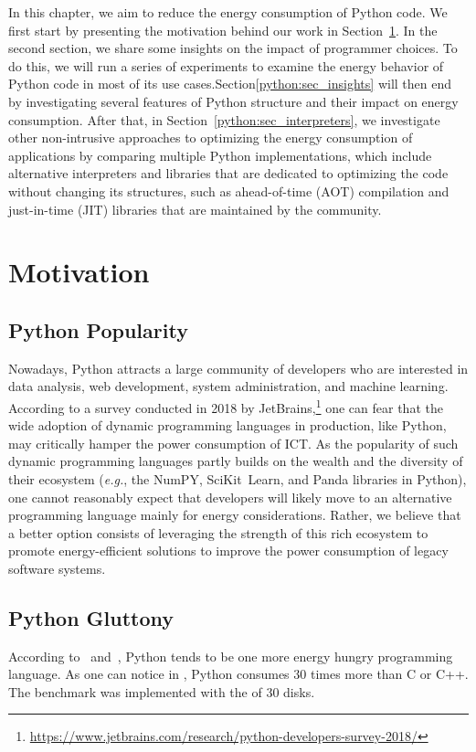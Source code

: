In this chapter, we aim to reduce the energy consumption of Python code.
We first start by presenting the motivation behind our work in Section~\ref{python:sec_motivation}.
In the second section, we share some insights on the impact of programmer choices. To do this, we will run a series of experiments to examine the energy behavior of Python code in most of its use cases.Section\ref{python:sec_insights} will then end by investigating several features of Python structure and their impact on energy consumption.
After that, in Section~\ref{python:sec_interpreters}, we investigate other non-intrusive approaches to optimizing the energy consumption of applications by comparing multiple Python implementations, which include alternative interpreters and libraries that are dedicated to optimizing the code without changing its structures, such as ahead-of-time (AOT) compilation and just-in-time (JIT) libraries that are maintained by the community.


\section{Motivation}\label{python:sec_motivation}

\subsection{Python Popularity}
Nowadays, Python attracts a large community of developers who are interested in data analysis, web development, system administration, and machine learning.
According to a survey conducted in 2018 by JetBrains,\footnote{\url{https://www.jetbrains.com/research/python-developers-survey-2018/}} one can fear that the wide adoption of dynamic programming languages in production, like Python, may critically hamper the power consumption of ICT.
As the popularity of such dynamic programming languages partly builds on the wealth and the diversity of their ecosystem (\emph{e.g.}, the NumPY, SciKit\, Learn, and Panda libraries in Python), one cannot reasonably expect that developers will likely move to an alternative programming language mainly for energy considerations.
Rather, we believe that a better option consists of leveraging the strength of this rich ecosystem to promote energy-efficient solutions to improve the power consumption of legacy software systems.

\subsection{Python Gluttony}
According to~\cite{pinto_energy_2017} and~\cite{noureddine_preliminary_2012}, Python tends to be one more energy hungry programming language.
As one can notice in , Python consumes $30$ times more than C or C++.
The benchmark was implemented with the  of 30 disks.

